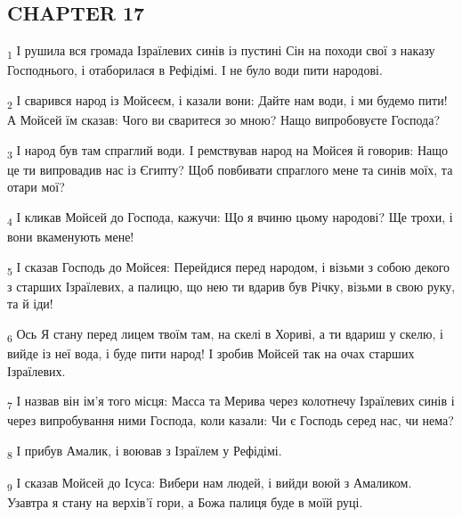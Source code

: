 \subsection{CHAPTER 17}
\begin{tcolorbox}
\textsubscript{1} І рушила вся громада Ізраїлевих синів із пустині Сін на походи свої з наказу Господнього, і отаборилася в Рефідімі. І не було води пити народові.
\end{tcolorbox}
\begin{tcolorbox}
\textsubscript{2} І сварився народ із Мойсеєм, і казали вони: Дайте нам води, і ми будемо пити! А Мойсей їм сказав: Чого ви сваритеся зо мною? Нащо випробовуєте Господа?
\end{tcolorbox}
\begin{tcolorbox}
\textsubscript{3} І народ був там спраглий води. І ремствував народ на Мойсея й говорив: Нащо це ти випровадив нас із Єгипту? Щоб повбивати спраглого мене та синів моїх, та отари мої?
\end{tcolorbox}
\begin{tcolorbox}
\textsubscript{4} І кликав Мойсей до Господа, кажучи: Що я вчиню цьому народові? Ще трохи, і вони вкаменують мене!
\end{tcolorbox}
\begin{tcolorbox}
\textsubscript{5} І сказав Господь до Мойсея: Перейдися перед народом, і візьми з собою декого з старших Ізраїлевих, а палицю, що нею ти вдарив був Річку, візьми в свою руку, та й іди!
\end{tcolorbox}
\begin{tcolorbox}
\textsubscript{6} Ось Я стану перед лицем твоїм там, на скелі в Хориві, а ти вдариш у скелю, і вийде із неї вода, і буде пити народ! І зробив Мойсей так на очах старших Ізраїлевих.
\end{tcolorbox}
\begin{tcolorbox}
\textsubscript{7} І назвав він ім'я того місця: Масса та Мерива через колотнечу Ізраїлевих синів і через випробування ними Господа, коли казали: Чи є Господь серед нас, чи нема?
\end{tcolorbox}
\begin{tcolorbox}
\textsubscript{8} І прибув Амалик, і воював з Ізраїлем у Рефідімі.
\end{tcolorbox}
\begin{tcolorbox}
\textsubscript{9} І сказав Мойсей до Ісуса: Вибери нам людей, і вийди воюй з Амаликом. Узавтра я стану на верхів'ї гори, а Божа палиця буде в моїй руці.
\end{tcolorbox}
